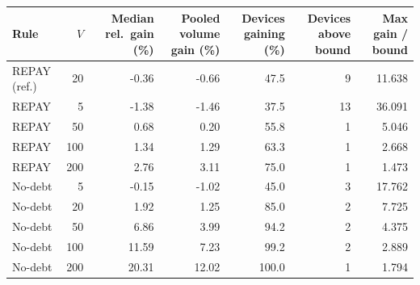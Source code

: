 \begin{tabular}{lrrrrrr}
\toprule
Rule & $V$ & Median rel.\ gain (\%) & Pooled volume gain (\%) & Devices gaining (\%) & Devices above bound & Max gain / bound \\
\midrule
REPAY (ref.) & 20 & -0.36 & -0.66 & 47.5 & 9 & 11.638 \\
\midrule
REPAY & 5 & -1.38 & -1.46 & 37.5 & 13 & 36.091 \\
REPAY & 50 & 0.68 & 0.20 & 55.8 & 1 & 5.046 \\
REPAY & 100 & 1.34 & 1.29 & 63.3 & 1 & 2.668 \\
REPAY & 200 & 2.76 & 3.11 & 75.0 & 1 & 1.473 \\
\midrule
No-debt & 5 & -0.15 & -1.02 & 45.0 & 3 & 17.762 \\
No-debt & 20 & 1.92 & 1.25 & 85.0 & 2 & 7.725 \\
No-debt & 50 & 6.86 & 3.99 & 94.2 & 2 & 4.375 \\
No-debt & 100 & 11.59 & 7.23 & 99.2 & 2 & 2.889 \\
No-debt & 200 & 20.31 & 12.02 & 100.0 & 1 & 1.794 \\
\bottomrule
\end{tabular}
